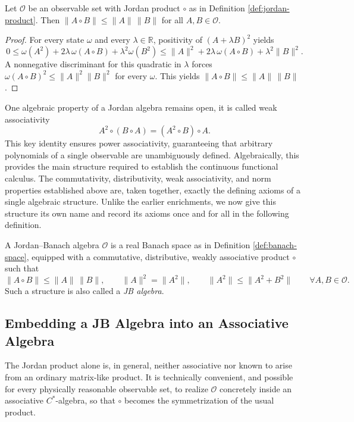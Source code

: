 \begin{proposition}
	Let $\mathcal{O}$ be an observable set with Jordan product $\circ$ as in Definition \ref{def:jordan-product}. Then $\|A\circ B\|\le\|A\|\,\|B\|$ for all $A,B\in\mathcal{O}$.
\end{proposition}
\begin{proof}
	For every state $\omega$ and every $\lambda\in\mathbb{R}$, positivity of
	$(A+\lambda B)^2$ yields
	$$0\le\omega(A^2)+2\lambda\,\omega(A\circ B)+\lambda^2\omega(B^2)\le
	\|A\|^2+2\lambda\,\omega(A\circ B)+\lambda^2\|B\|^2.$$ A nonnegative
	discriminant for this quadratic in $\lambda$ forces
	$\omega(A\circ B)^2\le\|A\|^2\|B\|^2$ for every $\omega$. This yields
	$\|A\circ B\|\le\|A\|\,\|B\|$.
\end{proof}

One algebraic property of a Jordan algebra remains open, it is called weak
associativity $$A^2\circ(B\circ A)=(A^2\circ B)\circ A.$$ This key identity ensures power associativity, guaranteeing that arbitrary polynomials of a single observable are unambiguously defined. Algebraically, this provides the main structure required to establish the continuous functional calculus. The commutativity, distributivity, weak associativity, and norm properties established above are, taken together, exactly the defining axioms of a
single algebraic structure. Unlike the earlier enrichments, we now give this structure its own name and record its axioms once and for all in the following definition.

\begin{definition}
	\label{def:jb-algebra}
	A Jordan--Banach algebra $\mathcal{O}$ is a real Banach space as in Definition \ref{def:banach-space}, equipped with a commutative, distributive, weakly associative product $\circ$ such that
	\[
	\|A\circ B\|\le\|A\|\,\|B\|, \qquad \|A\|^2=\|A^2\|,
	\qquad \|A^2\|\le\|A^2+B^2\| \qquad \forall A,B \in \mathcal{O}.
	\]
	Such a structure is also called a \emph{JB algebra}.
\end{definition}

\subsection*{Embedding a JB Algebra into an Associative Algebra}

The Jordan product alone is, in general, neither associative nor known to
arise from an ordinary matrix-like product. It is technically convenient, and possible for every physically reasonable observable set, to realize
$\mathcal{O}$ concretely inside an associative $C^*$-algebra, so that
$\circ$ becomes the symmetrization of the usual product.

